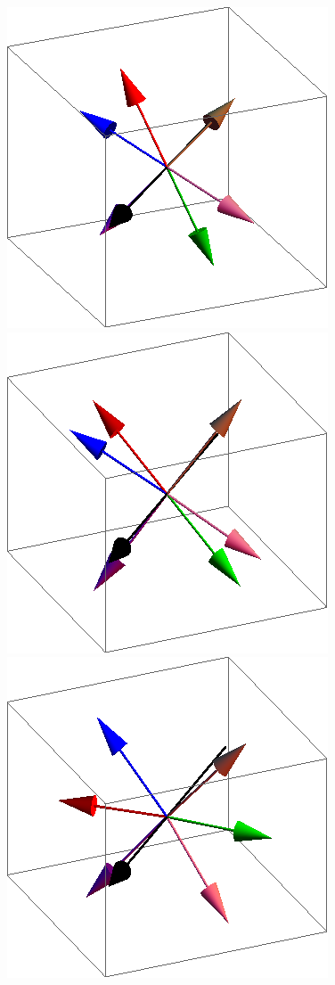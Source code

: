 \documentclass{article}
\begin{document}
\begin{figure}[ht]
\centering
\includegraphics[scale=0.33]{110/1S000to005R.png}
\includegraphics[scale=0.33]{110/69S000to005R.png}
\includegraphics[scale=0.33]{110/82S000to005R.png}

\end{figure}
\end{document}
